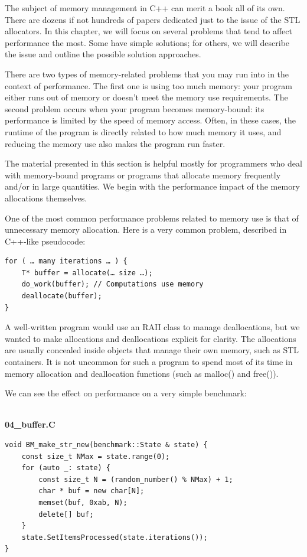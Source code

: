 
The subject of memory management in C++ can merit a book all of its own. There are dozens if not hundreds of papers dedicated just to the issue of the STL allocators. In this chapter, we will focus on several problems that tend to affect performance the most. Some have simple solutions; for others, we will describe the issue and outline the possible solution approaches. 

There are two types of memory-related problems that you may run into in the context of performance. The first one is using too much memory: your program either runs out of memory or doesn’t meet the memory use requirements. The second problem occurs when your program becomes memory-bound: its performance is limited by the speed of memory access. Often, in these cases, the runtime of the program is directly related to how much memory it uses, and reducing the memory use also makes the program run 
faster. 

The material presented in this section is helpful mostly for programmers who deal with memory-bound programs or programs that allocate memory frequently and/or in large quantities. We begin with the performance impact of the memory allocations themselves.


One of the most common performance problems related to memory use is that of unnecessary memory allocation. Here is a very common problem, described in C++-like pseudocode:

\begin{lstlisting}[style=styleCXX]
for ( … many iterations … ) {
	T* buffer = allocate(… size …);
	do_work(buffer); // Computations use memory
	deallocate(buffer);
}
\end{lstlisting}

A well-written program would use an RAII class to manage deallocations, but we wanted to make allocations and deallocations explicit for clarity. The allocations are usually concealed inside objects that manage their own memory, such as STL containers. It is not uncommon for such a program to spend most of its time in memory allocation and deallocation functions (such as malloc() and free()). 

We can see the effect on performance on a very simple benchmark:

\hspace*{\fill} \\ %
\noindent
\textbf{04\_buffer.C}
\begin{lstlisting}[style=styleCXX]
void BM_make_str_new(benchmark::State & state) {
	const size_t NMax = state.range(0);
	for (auto _: state) {
		const size_t N = (random_number() % NMax) + 1;
		char * buf = new char[N];
		memset(buf, 0xab, N);
		delete[] buf;
	}
	state.SetItemsProcessed(state.iterations());
}
\end{lstlisting}

